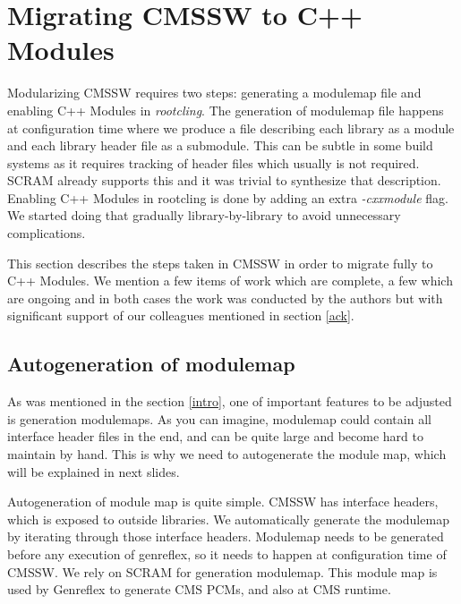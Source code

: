 \documentclass[12pt]{iopart}
\begin{document}
\section{Migrating CMSSW to C++ Modules}
\label{migration}

Modularizing CMSSW requires two steps: generating a modulemap file and enabling C++ Modules in \textit{rootcling}. The generation of modulemap file happens at configuration time where we produce a file describing each library as a module and each library header file as a submodule. This can be subtle in some build systems as it requires tracking of header files which usually is not required. SCRAM already supports this and it was trivial to synthesize that description. Enabling C++ Modules in rootcling is done by adding an extra \textit{-cxxmodule} flag. We started doing that gradually library-by-library to avoid unnecessary complications.

This section describes the steps taken in CMSSW in order to migrate fully to C++ Modules. We mention a few items of work which are complete, a few which are ongoing and in both cases the work was conducted by the authors but with significant support of our colleagues mentioned in section \ref{ack}.

\subsection{Autogeneration of modulemap}

As was mentioned in the section \ref{intro}, one of important features to be adjusted is generation modulemaps. As you can imagine, modulemap could contain all interface header files in the end, and can be quite large and become hard to maintain by hand. This is why we need to autogenerate the module map, which will be explained in next slides.

Autogeneration of module map is quite simple. CMSSW has interface headers, which is exposed to outside libraries. We automatically generate the modulemap by iterating through those interface headers. Modulemap needs to be generated before any execution of genreflex, so it needs to happen at configuration time of CMSSW.
We rely on SCRAM for generation modulemap. This module map is used by Genreflex to generate CMS PCMs, and also at CMS runtime.
\end{document}
